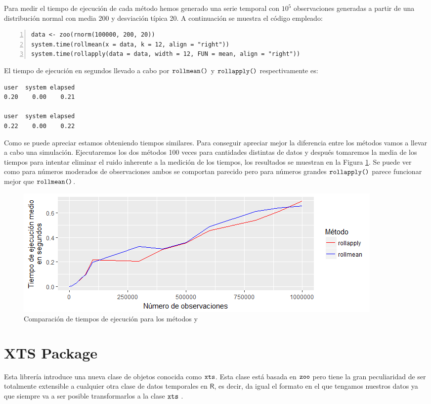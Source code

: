 Para medir el tiempo de ejecución de cada método hemos generado una serie temporal con $10^5$ observaciones generadas a partir de una distribución normal con media 200 y desviación típica 20. A continuación se muestra el código empleado:
\begin{Verbatim}[fontsize=\footnotesize, numbers = left]
data <- zoo(rnorm(100000, 200, 20))
system.time(rollmean(x = data, k = 12, align = "right"))
system.time(rollapply(data = data, width = 12, FUN = mean, align = "right"))
\end{Verbatim}

El tiempo de ejecución en segundos llevado a cabo por $\verb!rollmean()!$ y $\verb!rollapply()!$ respectivamente es:
\begin{Verbatim}[fontsize=\footnotesize]
user  system elapsed
0.20    0.00    0.21

user  system elapsed
0.22    0.00    0.22
\end{Verbatim}

Como se puede apreciar estamos obteniendo tiempos similares. Para conseguir apreciar mejor la diferencia entre los métodos vamos a llevar a cabo una simulación. Ejecutaremos los dos métodos 100 veces para cantidades distintas de datos y después tomaremos la media de los tiempos para intentar eliminar el ruido inherente a la medición de los tiempos, los resultados se muestran en la Figura \ref{times_1}. Se puede ver como para números moderados de observaciones ambos se comportan parecido pero para números grandes $\verb!rollapply()!$ parece funcionar mejor que $\verb!rollmean()!$.

\begin{figure}
    \centering
    \centerline{\includegraphics[scale = 0.7]{Images/Estructura/timing-roll.png}}
    \caption{Comparación de tiempos de ejecución para los métodos  y }
    \label{times_1}
\end{figure}

\section{XTS Package}
Esta librería introduce una nueva clase de objetos conocida como $\verb!xts!$. Esta clase está basada en $\verb!zoo!$ pero tiene la gran peculiaridad de ser totalmente extensible a cualquier otra clase de datos temporales en $\textsf{R}$, es decir, da igual el formato en el que tengamos nuestros datos ya que siempre va a ser posible transformarlos a la clase $\verb!xts!$ \cite{xts}.

